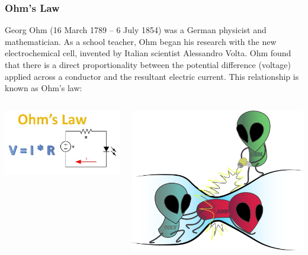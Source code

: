 \documentclass{beamer}
\begin{document}
\begin{frame}\frametitle{Ohm's Law}
Georg  Ohm (16 March 1789 – 6 July 1854) was a German physicist and mathematician. As a school teacher, Ohm began his research with the new electrochemical cell, invented by Italian scientist Alessandro Volta. Ohm found that there is a direct proportionality between the potential difference (voltage) applied across a conductor and the resultant electric current. This relationship is known as Ohm's law:
\vspace{0.5cm}
\begin{columns}
\begin{column}{5.5cm}
\includegraphics[scale=0.33]{fig/ol2.jpg}
\end{column}
\begin{column}{5.5cm}
\includegraphics[scale=.1]{fig/Volt_Amp_Ohm.png}
\end{column}
\end{columns}
\end{frame}
\end{document}
